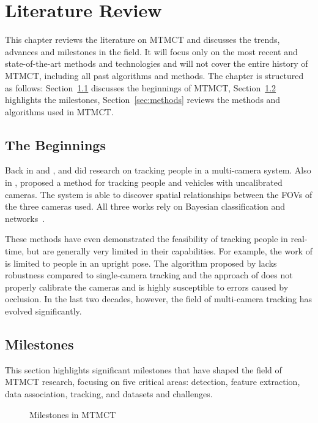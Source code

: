 \chapter{Literature Review}\label{chap:literature_review}
This chapter reviews the literature on MTMCT and discusses the trends, advances and milestones in the field. It will focus only on the most recent and state-of-the-art methods and technologies and will not cover the entire history of MTMCT, including all past algorithms and methods. The chapter is structured as follows: Section~\ref{sec:the_beginnings} discusses the beginnings of MTMCT, Section~\ref{sec:milestones} highlights the milestones, Section~\ref{sec:methods} reviews the methods and algorithms used in MTMCT.

\section{The Beginnings}\label{sec:the_beginnings}
Back in \citeyear{Cai99} and \citeyear{Chang01}, \textcite{Cai99} and \textcite{Chang01} did research on tracking people in a multi-camera system. Also in \citeyear{Khan01}, \textcite{Khan01} proposed a method for tracking people and vehicles with uncalibrated cameras. The system is able to discover spatial relationships between the FOVs of the three cameras used. All three works rely on Bayesian classification and networks~\cite{Pearl88}.

These methods have even demonstrated the feasibility of tracking people in real-time, but are generally very limited in their capabilities. For example, the work of \citeauthor{Chang01} is limited to people in an upright pose. The algorithm proposed by \citeauthor{Cai99} lacks robustness compared to single-camera tracking and the approach of \citeauthor{Khan01} does not properly calibrate the cameras and is highly susceptible to errors caused by occlusion. In the last two decades, however, the field of multi-camera tracking has evolved significantly.

\section{Milestones}\label{sec:milestones}
This section highlights significant milestones that have shaped the field of MTMCT research, focusing on five critical areas: detection, feature extraction, data association, tracking, and datasets and challenges.

\begin{figure}[ht]
    \centering
    
    \caption{Milestones in MTMCT}\label{fig:milestones}
\end{figure}

